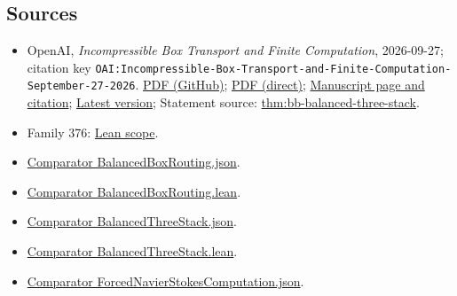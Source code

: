 \documentclass[11pt]{article}
\begin{document}
\subsection{Sources}
\begin{itemize}
\item OpenAI, \emph{Incompressible Box Transport and Finite Computation}, 2026-09-27; citation key \texttt{OAI:Incompressible-Box-Transport-and-Finite-Computation-September-27-2026}. \href{https://github.com/openai/math/blob/adc7f1241b42e322a6451854ab7e4b4c146bf78a/preprints/Incompressible-Box-Transport-and-Finite-Computation-September-27-2026/manuscript.pdf}{PDF (GitHub)}; \href{https://github.com/openai/math/raw/adc7f1241b42e322a6451854ab7e4b4c146bf78a/preprints/Incompressible-Box-Transport-and-Finite-Computation-September-27-2026/manuscript.pdf}{PDF (direct)}; \href{https://github.com/openai/math/blob/adc7f1241b42e322a6451854ab7e4b4c146bf78a/preprints/Incompressible-Box-Transport-and-Finite-Computation-September-27-2026/README.md}{Manuscript page and citation}; \href{https://github.com/openai/math/blob/main/preprints/Incompressible-Box-Transport-and-Finite-Computation-September-27-2026/manuscript.pdf}{Latest version}; Statement source: \href{https://github.com/openai/math/blob/adc7f1241b42e322a6451854ab7e4b4c146bf78a/preprints/Incompressible-Box-Transport-and-Finite-Computation-September-27-2026/build/balanced.tex\#L11}{thm:bb-balanced-three-stack}.
\item Family 376: \href{https://github.com/openai/math/blob/adc7f1241b42e322a6451854ab7e4b4c146bf78a/lean/docs/376.md}{Lean scope}.
\item \href{https://github.com/openai/math/blob/adc7f1241b42e322a6451854ab7e4b4c146bf78a/lean/ComparatorChallenges/BalancedBoxRouting.json}{Comparator BalancedBoxRouting.json}.
\item \href{https://github.com/openai/math/blob/adc7f1241b42e322a6451854ab7e4b4c146bf78a/lean/ComparatorChallenges/BalancedBoxRouting.lean}{Comparator BalancedBoxRouting.lean}.
\item \href{https://github.com/openai/math/blob/adc7f1241b42e322a6451854ab7e4b4c146bf78a/lean/ComparatorChallenges/BalancedThreeStack.json}{Comparator BalancedThreeStack.json}.
\item \href{https://github.com/openai/math/blob/adc7f1241b42e322a6451854ab7e4b4c146bf78a/lean/ComparatorChallenges/BalancedThreeStack.lean}{Comparator BalancedThreeStack.lean}.
\item \href{https://github.com/openai/math/blob/adc7f1241b42e322a6451854ab7e4b4c146bf78a/lean/ComparatorChallenges/ForcedNavierStokesComputation.json}{Comparator ForcedNavierStokesComputation.json}.

\end{itemize}
\end{document}
